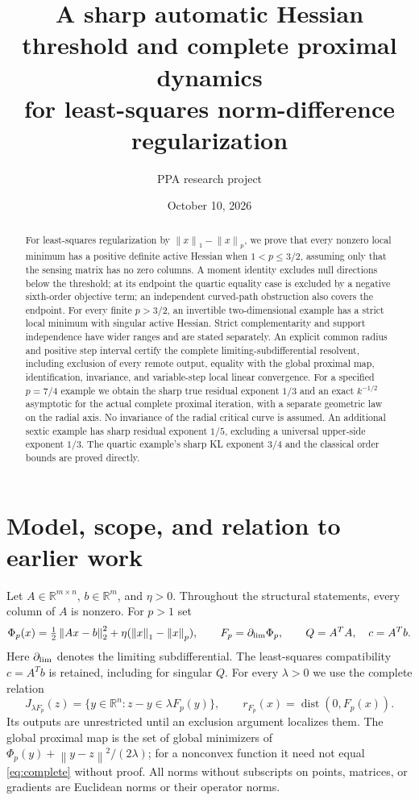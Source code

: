 \documentclass[11pt]{article}
\title{A sharp automatic Hessian threshold and complete proximal dynamics\\for least-squares norm-difference regularization}
\author{PPA research project}
\date{October 10, 2026}
\newcommand{\norm}[1]{\left\lVert#1\right\rVert}
\newcommand{\dist}{\operatorname{dist}}
\theoremstyle{remark}\newtheorem{remark}[theorem]{Remark}
\begin{document}
\maketitle
\begin{abstract}
For least-squares regularization by $\norm{x}_1-\norm{x}_p$, we prove
that every nonzero local minimum has a positive definite active Hessian
when $1<p\le3/2$, assuming only that the sensing matrix has no zero
columns. A moment identity excludes null directions below the threshold;
at its endpoint the quartic equality case is excluded by a negative
sixth-order objective term; an independent curved-path obstruction
also covers the endpoint. For every finite $p>3/2$, an invertible
 two-dimensional example has a strict local minimum with singular active
Hessian. Strict complementarity and support independence have wider
ranges and are stated separately. An explicit common radius and positive
step interval certify the complete limiting-subdifferential resolvent,
including exclusion of every remote output, equality with the global
proximal map, identification, invariance, and variable-step local linear
convergence. For a specified $p=7/4$ example we obtain the sharp true
residual exponent $1/3$ and an exact $k^{-1/2}$ asymptotic for the actual
complete proximal iteration, with a separate geometric law on the radial
axis. No invariance of the radial critical curve is assumed.
An additional sextic example has sharp residual exponent $1/5$,
excluding a universal upper-side exponent $1/3$. The quartic example's
sharp KL exponent $3/4$ and the classical order bounds are proved directly.
\end{abstract}

\section{Model, scope, and relation to earlier work}
Let $A\in\mathbb R^{m\times n}$, $b\in\mathbb R^m$, and $\eta>0$.
Throughout the structural statements, every column of $A$ is nonzero.
For $p>1$ set
\begin{equation}\label{eq:model}
 \Phi_p(x)=\tfrac12\norm{Ax-b}_2^2+
 \eta(\norm{x}_1-\norm{x}_p),\qquad F_p=\partial_{\rm lim}\Phi_p,
 \qquad Q=A^TA,\quad c=A^Tb.
\end{equation}
Here $\partial_{\rm lim}$ denotes the limiting subdifferential. The
least-squares compatibility $c=A^Tb$ is retained, including for singular
$Q$. For every $\lambda>0$ we use the complete relation
\begin{equation}\label{eq:complete}
 J_{\lambda F_p}(z)=\{y\in\mathbb R^n:z-y\in\lambda F_p(y)\},
 \qquad r_{F_p}(x)=\dist(0,F_p(x)).
\end{equation}
Its outputs are unrestricted until an exclusion argument localizes them.
The global proximal map is the set of global minimizers of
$\Phi_p(y)+\norm{y-z}^2/(2\lambda)$; for a nonconvex function it need
not equal \eqref{eq:complete} without proof. All norms without subscripts
on points, matrices, or gradients are Euclidean norms or their operator
norms.
\end{document}
